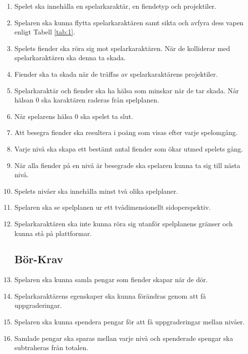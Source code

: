 \documentclass{TDP005mall}
\begin{document}
\begin{enumerate}
\item Spelet ska innehålla en spelarkaraktär, en fiendetyp och projektiler.
\item Spelaren ska kunna flytta spelarkaraktären samt sikta och avfyra dess vapen enligt Tabell \ref{tab:1}.
\item Spelets fiender ska röra sig mot spelarkaraktären. När de kolliderar med spelarkaraktären ska denna ta skada.
\item Fiender ska ta skada när de träffas av spelarkaraktärens projektiler.
\item Spelarkaraktär och fiender ska ha hälsa som minskar när de tar skada. Når hälsan 0 ska karaktären raderas från spelplanen.
\item Når spelarens hälsa 0 ska spelet ta slut.
\item Att besegra fiender ska resultera i poäng som visas efter varje spelomgång.
\item Varje nivå ska skapa ett bestämt antal fiender som ökar utmed spelets gång.
\item När alla fiender på en nivå är besegrade ska spelaren kunna ta sig till nästa nivå. 
\item Spelets nivåer ska innehålla minst två olika spelplaner.
\item Spelaren ska se spelplanen ur ett tvådimensionellt sidoperspektiv.
\item Spelarkaraktären ska inte kunna röra sig utanför spelplanens gränser och kunna stå på plattformar.


\subsection{Bör-Krav}

\item Spelaren ska kunna samla pengar som fiender skapar när de dör.
\item Spelarkaraktärens egenskaper ska kunna förändras genom att få uppgraderingar. 
\item Spelaren ska kunna spendera pengar för att få uppgraderingar mellan nivåer.
\item Samlade pengar ska sparas mellan varje nivå och spenderade spengar ska subtraheras från totalen.
\end{enumerate}
\end{document}
